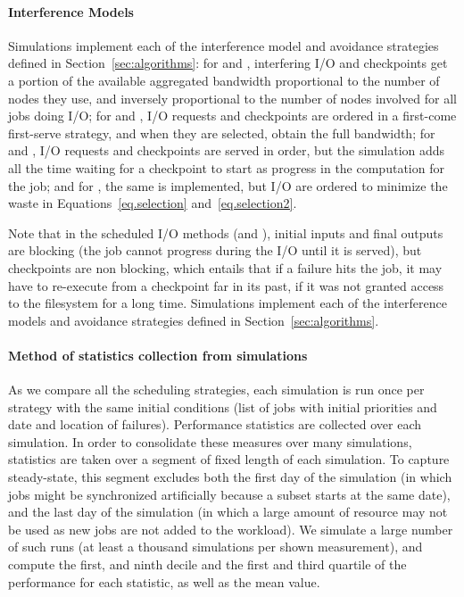 \ifTR

\paragraph*{Interference Models} Simulations implement each of the
interference model and avoidance strategies defined in
Section~\ref{sec:algorithms}: for \propfixed and \propdaly,
interfering I/O and checkpoints get a portion of the available
aggregated bandwidth proportional to the number of nodes they use, and
inversely proportional to the number of nodes involved for all
jobs doing I/O; for \bfifofixed and \bfifodaly, I/O requests
and checkpoints are ordered in a first-come first-serve strategy, and
when they are selected, obtain the full bandwidth; for \fifofixed and
\fifodaly, I/O requests and checkpoints are served in order, but the
simulation adds all the time waiting for a checkpoint to start as
progress in the computation for the job; and for \cooperative,
the same is implemented, but I/O are ordered to minimize the waste in
Equations~\eqref{eq.selection} and~\eqref{eq.selection2}.

Note that in the scheduled I/O methods (\fifononblock and \cooperative),
initial inputs and final outputs are blocking (the job
cannot progress during the I/O until it is served), but checkpoints
are non blocking, which entails that if a failure hits the job,
it may have to re-execute from a checkpoint far in its past, if it was not
granted access to the filesystem for a long time.
\else
Simulations implement each of the interference models and avoidance
strategies defined in Section~\ref{sec:algorithms}.
\fi

\paragraph*{Method of statistics collection from simulations}
As we compare all the scheduling strategies, each simulation is run
once per strategy with the same initial conditions (list of jobs with
initial priorities and date and location of failures). Performance
statistics are collected over each simulation. In order to consolidate
these measures over many simulations, statistics are taken over a
segment of fixed length of each simulation.  To capture steady-state,
this segment excludes both the first day of the simulation (in which
jobs might be synchronized artificially because a subset
starts at the same date), and the last day of the simulation (in which
a large amount of resource may not be used as new jobs are not
added to the workload). We simulate a large number of such runs (at
least a thousand simulations per shown measurement), and compute the
first, and ninth decile and the first and third quartile of the
performance for each statistic, as well as the mean value.
